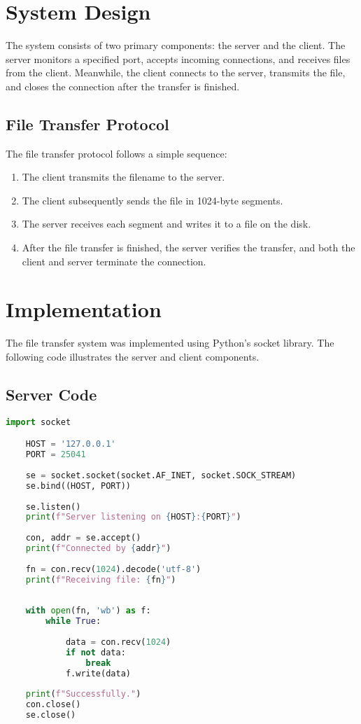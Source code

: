 \documentclass[a4paper,12pt]{article}
\begin{document}
\section{System Design}
The system consists of two primary components: the server and the client. The server monitors a specified port, accepts incoming connections, and receives files from the client. Meanwhile, the client connects to the server, transmits the file, and closes the connection after the transfer is finished.

\subsection{File Transfer Protocol}
The file transfer protocol follows a simple sequence:
\begin{enumerate}
    \item The client transmits the filename to the server.
    \item The client subsequently sends the file in 1024-byte segments.
    \item The server receives each segment and writes it to a file on the disk.
    \item After the file transfer is finished, the server verifies the transfer, and both the client and server terminate the connection.
\end{enumerate}

\section{Implementation}
The file transfer system was implemented using Python's socket library. The following code illustrates the server and client components.

\subsection{Server Code}

\begin{lstlisting}[language=Python, caption=Server Code]
    import socket

    HOST = '127.0.0.1'  
    PORT = 25041   
    
    se = socket.socket(socket.AF_INET, socket.SOCK_STREAM)
    se.bind((HOST, PORT))
    
    se.listen()
    print(f"Server listening on {HOST}:{PORT}")
    
    con, addr = se.accept()
    print(f"Connected by {addr}")
    
    fn = con.recv(1024).decode('utf-8') 
    print(f"Receiving file: {fn}")
    
    
    with open(fn, 'wb') as f:
        while True:
            
            data = con.recv(1024)
            if not data:
                break  
            f.write(data)
    
    print(f"Successfully.")
    con.close() 
    se.close()
\end{lstlisting}
\end{document}
